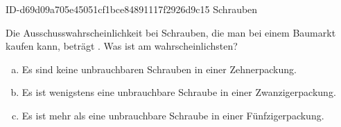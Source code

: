 \begin{exercise}
      {ID-d69d09a705e45051cf1bce84891117f2926d9c15}
      {Schrauben}
  \ifproblem\problem\par
    Die Ausschusswahrscheinlichkeit bei Schrauben, die man bei einem Baumarkt
    kaufen kann, beträgt . Was ist am wahrscheinlichsten?
    \begin{enumerate}[a)]
      \item Es sind keine unbrauchbaren Schrauben in einer Zehnerpackung.
      \item Es ist wenigstens eine unbrauchbare Schraube in einer Zwanzigerpackung.
      \item Es ist mehr als eine unbrauchbare Schraube in einer Fünfzigerpackung.
    \end{enumerate}
  \fi
\end{exercise}

